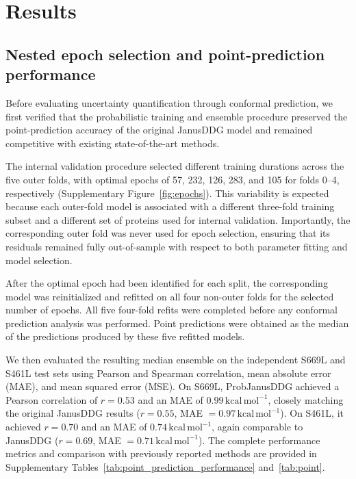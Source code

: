\documentclass[11pt]{article}
\begin{document}
\section{Results}

\subsection{Nested epoch selection and point-prediction performance}

Before evaluating uncertainty quantification through conformal prediction, we first verified that the probabilistic training and ensemble procedure preserved the point-prediction accuracy of the original JanusDDG model and remained competitive with existing state-of-the-art methods.

The internal validation procedure selected different training durations across the five outer folds, with optimal epochs of 57, 232, 126, 283, and 105 for folds 0--4, respectively (Supplementary Figure~\ref{fig:epochs}). This variability is expected because each outer-fold model is associated with a different three-fold training subset and a different set of proteins used for internal validation. Importantly, the corresponding outer fold was never used for epoch selection, ensuring that its residuals remained fully out-of-sample with respect to both parameter fitting and model selection.

After the optimal epoch had been identified for each split, the corresponding model was reinitialized and refitted on all four non-outer folds for the selected number of epochs. All five four-fold refits were completed before any conformal prediction analysis was performed. Point predictions were obtained as the median of the predictions produced by these five refitted models.

We then evaluated the resulting median ensemble on the independent S669L and S461L test sets using Pearson and Spearman correlation, mean absolute error (MAE), and mean squared error (MSE). On S669L, ProbJanusDDG achieved a Pearson correlation of \(r=0.53\) and an MAE of \(0.99\,\mathrm{kcal\,mol^{-1}}\), closely matching the original JanusDDG results (\(r=0.55\), MAE \(=0.97\,\mathrm{kcal\,mol^{-1}}\)). On S461L, it achieved \(r=0.70\) and an MAE of \(0.74\,\mathrm{kcal\,mol^{-1}}\), again comparable to JanusDDG (\(r=0.69\), MAE \(=0.71\,\mathrm{kcal\,mol^{-1}}\)). The complete performance metrics and comparison with previously reported methods are provided in Supplementary Tables~\ref{tab:point_prediction_performance} and~\ref{tab:point}.
\end{document}
